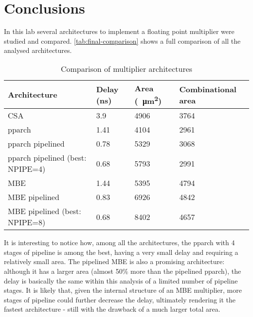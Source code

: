 \chapter{Conclusions}
In this lab several architectures to implement a floating point multiplier were studied and compared. \autoref{tab:final-comparison} shows a full comparison of all the analysed architectures.

\begin{table}[htbp]
	\centering
	\begin{tabular}{|l|l|l|l|}\hline
		Architecture                      & Delay (ns) & Area (\SI{}{\micro m^2}) & Combinational area \\ \hline
		CSA                               & 3.9        & 4906                     & 3764 \\ \hline
		pparch                            & 1.41       & 4104                     & 2961 \\ \hline
        pparch pipelined                  & 0.78       & 5329                     & 3068 \\ \hline
        pparch pipelined (best: NPIPE=4)  & 0.68       & 5793                     & 2991 \\ \hline
        MBE                               & 1.44       & 5395                     & 4794 \\ \hline
        MBE pipelined                     & 0.83       & 6926                     & 4842 \\ \hline
        MBE pipelined (best: NPIPE=8)     & 0.68       & 8402                     & 4657 \\ \hline
	\end{tabular}
    \caption{Comparison of multiplier architectures}
    \label{tab:final-comparison}
\end{table}

It is interesting to notice how, among all the architectures, the pparch with 4 stages of pipeline is among the best, having a very small delay and requiring a relatively small area. The pipelined MBE is also a promising architecture: although it has a larger area (almost 50\% more than the pipelined pparch), the delay is basically the same within this analysis of a limited number of pipeline stages. It is likely that, given the internal structure of an MBE multiplier, more stages of pipeline could further decrease the delay, ultimately rendering it the fastest architecture - still with the drawback of a much larger total area.
